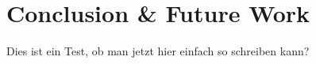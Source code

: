 
\chapter{Conclusion & Future Work}
\label{chapter:Conc_Fut}
Dies ist ein Test, ob man jetzt hier einfach so schreiben kann?